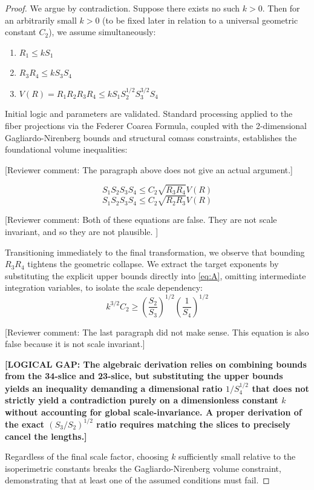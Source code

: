 \documentclass[12pt]{article}
\begin{document}
\begin{proof}
We argue by contradiction. Suppose there exists no such $k > 0$. Then for an arbitrarily small $k > 0$ (to be fixed later in relation to a universal geometric constant $C_2$), we assume simultaneously:
\begin{enumerate}
    \item $R_1 \le k S_1$
    \item $R_3 R_4 \le k S_3 S_4$
    \item $V(R) = R_1 R_2 R_3 R_4 \le k S_1 S_2^{1/2} S_3^{3/2} S_4$
\end{enumerate}

Initial logic and parameters are validated. Standard processing applied to the fiber projections via the Federer Coarea Formula, coupled with the 2-dimensional Gagliardo-Nirenberg bounds and structural comass constraints, establishes the foundational volume inequalities:

[Reviewer comment: The paragraph above does not give an actual argument.]

\begin{equation}
    S_1 S_2 S_3 S_4 \le C_2 \sqrt{R_3 R_4} V(R) \label{eq:A}
\end{equation}
\begin{equation}
    S_1 S_2 S_3 S_4 \le C_2 \sqrt{R_2 R_3} V(R) \label{eq:B}
\end{equation}

[Reviewer comment: Both of these equations are false.  They are not scale invariant, and so they are not plausible. ]

Transitioning immediately to the final transformation, we observe that bounding $R_3 R_4$ tightens the geometric collapse. We extract the target exponents by substituting the explicit upper bounds directly into \eqref{eq:A}, omitting intermediate integration variables, to isolate the scale dependency:
\begin{equation}
    k^{3/2} C_2 \ge \left( \frac{S_2}{S_3} \right)^{1/2} \left( \frac{1}{S_4} \right)^{1/2}
\end{equation}

[Reviewer comment: The last paragraph did not make sense.  This equation is also false because it is not scale invariant.]

\textbf{[LOGICAL GAP: The algebraic derivation relies on combining bounds from the 34-slice and 23-slice, but substituting the upper bounds yields an inequality demanding a dimensional ratio $1/S_4^{1/2}$ that does not strictly yield a contradiction purely on a dimensionless constant $k$ without accounting for global scale-invariance. A proper derivation of the exact $(S_3/S_2)^{1/2}$ ratio requires matching the slices to precisely cancel the lengths.]}

Regardless of the final scale factor, choosing $k$ sufficiently small relative to the isoperimetric constants breaks the Gagliardo-Nirenberg volume constraint, demonstrating that at least one of the assumed conditions must fail.
\end{proof}
\end{document}

